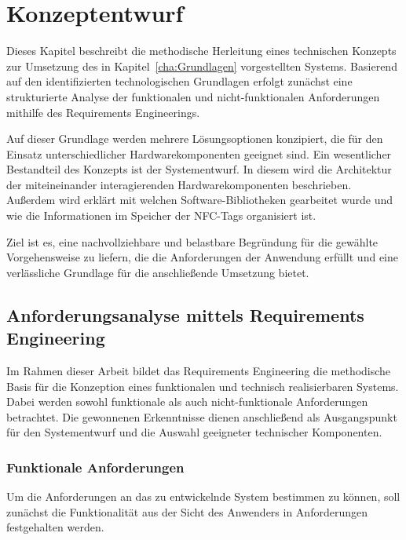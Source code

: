 \chapter{Konzeptentwurf}
\label{cha:vorgehen}

Dieses Kapitel beschreibt die methodische Herleitung eines technischen Konzepts zur Umsetzung des in Kapitel~\ref{cha:Grundlagen} vorgestellten Systems. Basierend auf den identifizierten technologischen Grundlagen erfolgt zunächst eine strukturierte Analyse der funktionalen und nicht-funktionalen Anforderungen mithilfe des Requirements Engineerings.

Auf dieser Grundlage werden mehrere Lösungsoptionen konzipiert, die für den Einsatz unterschiedlicher Hardwarekomponenten geeignet sind. Ein wesentlicher Bestandteil des Konzepts ist der Systementwurf. In diesem wird die Architektur der miteineinander interagierenden Hardwarekomponenten beschrieben. Außerdem wird erklärt mit welchen Software-Bibliotheken gearbeitet wurde und wie die Informationen im Speicher der NFC-Tags organisiert ist.

Ziel ist es, eine nachvollziehbare und belastbare Begründung für die gewählte Vorgehensweise zu liefern, die die Anforderungen der Anwendung erfüllt und eine verlässliche Grundlage für die anschließende Umsetzung bietet.

\section{Anforderungsanalyse mittels Requirements Engineering}
\label{sec:anforderungsanalyse}

Im Rahmen dieser Arbeit bildet das Requirements Engineering die methodische Basis für die Konzeption eines funktionalen und technisch realisierbaren Systems. Dabei werden sowohl funktionale als auch nicht-funktionale Anforderungen betrachtet. Die gewonnenen Erkenntnisse dienen anschließend als Ausgangspunkt für den Systementwurf und die Auswahl geeigneter technischer Komponenten.

\subsection{Funktionale Anforderungen}

Um die Anforderungen an das zu entwickelnde System bestimmen zu können, soll zunächst die Funktionalität aus der Sicht des Anwenders in Anforderungen festgehalten werden.

